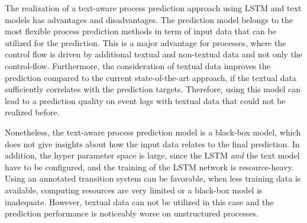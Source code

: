 The realization of a text-aware process prediction approach using LSTM and text models has advantages and disadvantages.
The prediction model belongs to the most flexible process prediction methods in term of input data that can be utilized for the prediction.
This is a major advantage for processes, where the control flow is driven by additional textual and non-textual data and not only the control-flow.
Furthermore, the consideration of textual data improves the prediction compared to the current state-of-the-art approach, if the textual data sufficiently correlates with the prediction targets.
Therefore, using this model can lead to a prediction quality on event logs with textual data that could not be realized before.

Nonetheless, the text-aware process prediction model is a black-box model, which does not give insights about how the input data relates to the final prediction.
In addition, the hyper parameter space is large, since the LSTM \textit{and} the text model have to be configured, and the training of the LSTM network is resource-heavy.
Using an annotated transition system can be favorable, when less training data is available, computing resources are very limited or a black-box model is inadequate.
However, textual data can not be utilized in this case and the prediction performance is noticeably worse on unstructured processes.